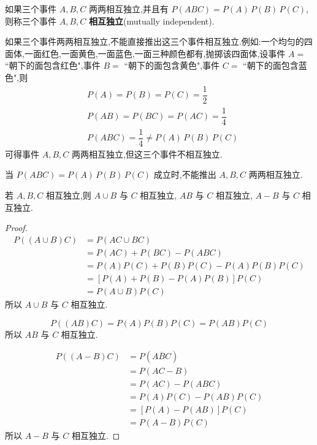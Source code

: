 \begin{definition}
    \indent 如果三个事件 $A,B,C$ 两两相互独立,并且有 $P(ABC)=P(A)\,P(B)\,P(C)$,则称三个事件 $A,B,C$ \textbf{相互独立}(mutually independent).
\end{definition}

\begin{note}
    \indent 如果三个事件两两相互独立,不能直接推出这三个事件相互独立.例如:一个均匀的四面体,一面红色,一面黄色,一面蓝色,一面三种颜色都有,抛掷该四面体,设事件 $A=$ ``朝下的面包含红色",事件 $B=$ ``朝下的面包含黄色",事件 $C=$ ``朝下的面包含蓝色",则
    $$
    \begin{aligned}
        & P(A) = P(B) = P(C) = \dfrac{1}{2} \\
        & P(AB) = P(BC) = P(AC) = \dfrac{1}{4} \\
        & P(ABC) = \dfrac{1}{4} \not= P(A) \, P(B) \, P(C)
    \end{aligned}
    $$
    可得事件 $A,B,C$ 两两相互独立,但这三个事件不相互独立.

    当 $P(ABC)=P(A)\,P(B)\,P(C)$ 成立时,不能推出 $A,B,C$ 两两相互独立.
\end{note}

\begin{conclusion}
    \indent 若 $A,B,C$ 相互独立,则 $A \cup B$ 与 $C$ 相互独立, $AB$ 与 $C$ 相互独立, $A-B$ 与 $C$ 相互独立.
\end{conclusion}

\begin{proof}
    $$
    \begin{aligned}
        P((A \cup B) C) &= P(AC \cup BC) \\
        &= P(AC) + P(BC) - P(ABC) \\
        &= P(A) P(C) + P(B) P(C) - P(A) P(B) P(C) \\
        &= [P(A) + P(B) - P(A) P(B)] P(C) \\
        &= P(A \cup B) P(C)
    \end{aligned}
    $$
    所以 $A \cup B$ 与 $C$ 相互独立.

    $$
    P((AB)C) = P(A) P(B) P(C) = P(AB) P(C)
    $$
    所以 $AB$ 与 $C$ 相互独立.

    $$
    \begin{aligned}
        P((A-B)C) &= P(A \overline{B} C) \\
        &= P(AC-B) \\
        &= P(AC) - P(ABC) \\
        &= P(A) P(C) - P(AB) P(C) \\
        &= [P(A) - P(AB)] P(C) \\
        &= P(A-B) P(C)
    \end{aligned}
    $$
    所以 $A-B$ 与 $C$ 相互独立.
\end{proof}


